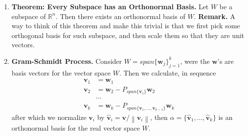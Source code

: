\documentclass[oneside, 12pt]{book}
\newcommand{\settag}[1]{\renewcommand{\theenumi}{#1}}
\newcommand{\R}{\mathbb{R}}
\newcommand{\tbf}[1]{\textbf{#1}}
\newcommand{\norm}[1]{\left\lVert#1\right\rVert}
\newcommand{\para}[1]{\item \tbf{#1}}
\newcommand{\vv}{\mathbf{v}}
\newcommand{\vw}{\mathbf{w}}
\begin{document}
\begin{enumerate}
    \settag{4.4.9}
    \para{Theorem: Every Subspace has an Orthonormal Basis.} Let $W$ be a subspace of $\R^n$. 
    Then there exists an orthonormal basis of $W$. \newline 
    \textbf{Remark.} A way to think of this theorem and make this trivial is that we first 
    pick some orthogonal basis for such subspace, and then scale them so that they are unit vectors.
    
    \settag{4.4.9*}
    \para{Gram-Schmidt Process.} Consider $W = span\{\vw_j\}_{j=1}^k$, were the $\vw$'s are 
    basis vectors for the vector space $W$. Then we calculate, in sequence
    \begin{align*}
        \vv_1 &= \vw_1 \\
        \vv_2 &= \vw_2 - P_{span\{\vv_1\}}\vw_2 \\
              &\cdots  \\
        \vv_k &= \vw_k - P_{span\{\vv_1,...,\vv_{k-1}\}}\vw_k
    \end{align*}
    after which we normalize $\vv_i$ by $\hat{\vv}_i = \vv / \norm{\vv_i}$, then $\alpha = 
    \{\hat{\vv}_1,...,\hat{\vv}_k\}$ is an orthonormal basis for the real vector space $W$.
\end{enumerate}
\end{document}
